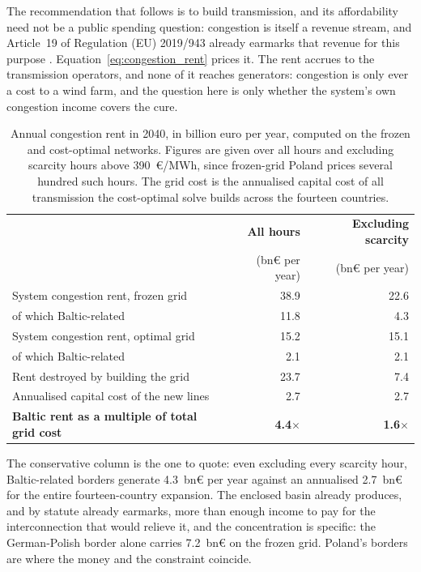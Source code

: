 The recommendation that follows is to build transmission, and its
affordability need not be a public spending question: congestion is itself a
revenue stream, and Article~19 of Regulation (EU) 2019/943 already earmarks
that revenue for this purpose \cite{EURegulation2019943}.
Equation~\ref{eq:congestion_rent} prices it. The rent accrues to the transmission operators, and none of it reaches
generators: congestion is only ever a cost to a wind farm, and the question here is only whether the
system's own congestion income covers the cure.

\begin{table}[!htb]
\centering
\small
\caption{Annual congestion rent in 2040, in billion euro per year, computed on
the frozen and cost-optimal networks. Figures are given over all hours and
excluding scarcity hours above 390~\euro/MWh, since frozen-grid Poland prices
several hundred such hours. The grid cost is the annualised capital cost of all
transmission the cost-optimal solve builds across the fourteen countries.}
\label{tab:congestion_rent}
\begin{tabular}{l r r}
\toprule
 & \textbf{All hours} & \textbf{Excluding scarcity} \\
 & (bn\euro{} per year) & (bn\euro{} per year) \\
\midrule
System congestion rent, frozen grid & 38.9 & 22.6 \\
\quad of which Baltic-related & 11.8 & 4.3 \\
System congestion rent, optimal grid & 15.2 & 15.1 \\
\quad of which Baltic-related & 2.1 & 2.1 \\
\midrule
Rent destroyed by building the grid & 23.7 & 7.4 \\
Annualised capital cost of the new lines & 2.7 & 2.7 \\
\midrule
\textbf{Baltic rent as a multiple of total grid cost} & \textbf{4.4$\times$} & \textbf{1.6$\times$} \\
\bottomrule
\end{tabular}
\end{table}

The conservative column is the one to quote: even excluding every scarcity
hour, Baltic-related borders generate 4.3~bn\euro{} per year against an
annualised 2.7~bn\euro{} for the entire fourteen-country expansion. The
enclosed basin already produces, and by statute already earmarks, more than
enough income to pay for the interconnection that would relieve it, and the
concentration is specific: the German-Polish border alone carries
7.2~bn\euro{} on the frozen grid. Poland's borders are where the money and
the constraint coincide.

